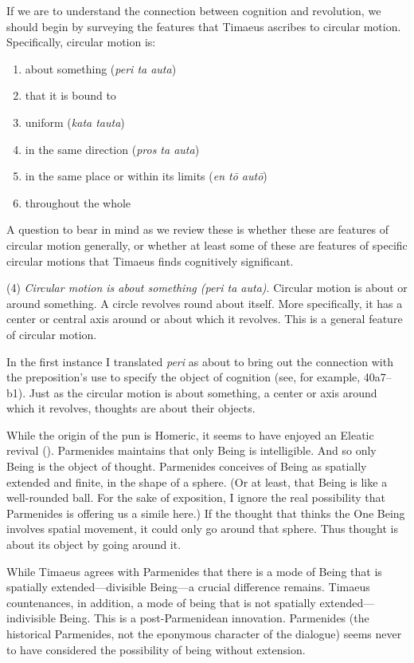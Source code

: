 If we are to understand the connection between cognition and revolution, we should begin by surveying the features that Timaeus ascribes to circular motion. Specifically, circular motion is:
\begin{enumerate}[(1)]
	\item about something (\emph{peri ta auta})
	\item that it is bound to
	\item uniform (\emph{kata tauta})
	\item in the same direction (\emph{pros ta auta})
	\item in the same place or within its limits (\emph{en tō autō})
	\item throughout the whole
\end{enumerate}
A question to bear in mind as we review these is whether these are features of circular motion generally, or whether at least some of these are features of specific circular motions that Timaeus finds cognitively significant.

(4) \emph{Circular motion is about something (\emph{peri ta auta})}. Circular motion is about or around something. A circle revolves round about itself. More specifically, it has a center or central axis around or about which it revolves. This is a general feature of circular motion. 

In the first instance I translated \emph{peri} as about to bring out the connection with the preposition's use to specify the object of cognition (see, for example, 40a7--b1). Just as the circular motion is about something, a center or axis around which it revolves, thoughts are about their objects. 

While the origin of the pun is Homeric, it seems to have enjoyed an Eleatic revival (\citealt[190--3]{Mourelatos:2008ve}). Parmenides maintains that only Being is intelligible. And so only Being is the object of thought. Parmenides conceives of Being as spatially extended and finite, in the shape of a sphere. (Or at least, that Being is like a well-rounded ball. For the sake of exposition, I ignore the real possibility that Parmenides is offering us a simile here.) If the thought that thinks the One Being involves spatial movement, it could only go around that sphere. Thus thought is about its object by going around it.

While Timaeus agrees with Parmenides that there is a mode of Being that is spatially extended---divisible Being---a crucial difference remains. Timaeus countenances, in addition, a mode of being that is not spatially extended---indivisible Being. This is a post-Parmenidean innovation. Parmenides (the historical Parmenides, not the eponymous character of the dialogue) seems never to have considered the possibility of being without extension.

